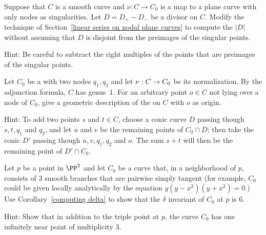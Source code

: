 \begin{exercise}\label{general case of divisors on nodal curves}
Suppose that $C$ is a smooth curve and $\nu: C \to C_0$ is a map to a
plane curve with
only nodes as singularities. Let $D = D_{+}-D_{-}$ be a divisor on
$C$. Modify the
technique of Section~\ref{linear series on nodal plane curves} to compute
the 
$|D|$ without assuming that $D$ is disjoint from the
preimages of the singular
points.

Hint: Be careful to subtract the right multiples of the points that are
preimages of the singular
points.
\end{exercise}

\begin{exercise}
Let $C_0$ be a 
%
%
with two nodes $q_1, q_2$
and
let $\nu :\nobreak C \to C_0$ be its normalization.
%
By the adjunction formula, $C$ has genus~1.
For an arbitrary point
$o \in C$ not
lying over a node of $C_0$,
 give a geometric description
of the 
on $C$ with $o$ as origin.

Hint: To add two points $s$ and $t \in C$, choose a conic curve $D$
passing though $s, t, q_1$ and $q_2$, and let $u$ and $v$ be the remaining
points of $C_0 \cap D$; then take the conic
$D'$ passing though $u, v,
q_1, q_2$ and $o$. The sum $s+t$ will then be the remaining point of $D'
\cap C_0$.
\end{exercise}

\begin{exercise}
Let $p$ be a point in $\PP^{2}$  and let $C_{0}$ be a curve that, in a neighborhood of $p$,
consists of 3 smooth branches that are pairwise simply tangent (for example, $C_{0}$
could be given locally analytically by the equation $y(y-x^{2})(y+x^{2})=0$.) Use Corollary~\ref{computing delta} to show that the $\delta$ invariant of $C_{0}$ at $p$ is 6.

Hint: Show that in addition to the triple point at $p$, the curve $C_{0}$ has one infinitely near point of multiplicity 3.
\end{exercise}

